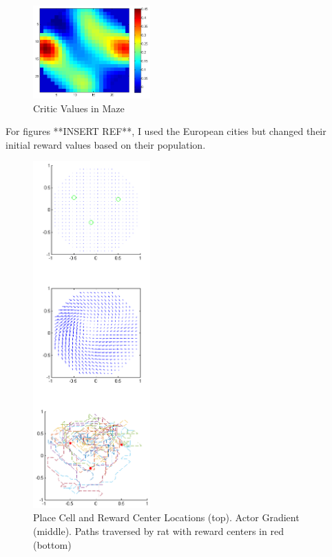 \documentclass[conference]{IEEEtran}
\begin{document}
\begin{figure}
\includegraphics[width=0.4\textwidth]{waterMazeRevisedD_Critic.png} 
\caption{Critic Values in Maze}
\end{figure}

For figures **INSERT REF**, I used the European cities but changed their initial reward values based on their population. 

\begin{figure}
\includegraphics[width=0.4\textwidth]{waterMazeRevised2_Figure_populationRewards.png} 
\caption{Place Cell and Reward Center Locations (top). Actor Gradient (middle). Paths traversed by rat with reward centers in red (bottom)}
\end{figure}
\end{document}
